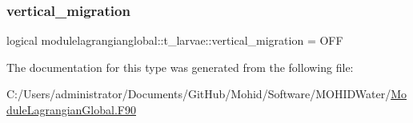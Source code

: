 \mbox{\label{structmodulelagrangianglobal_1_1t__larvae_aafa4ed785ca2f69e8e2d57cdf18af458}} 
\subsubsection{\texorpdfstring{vertical\+\_\+migration}{vertical\_migration}}
{\footnotesize\ttfamily logical modulelagrangianglobal\+::t\+\_\+larvae\+::vertical\+\_\+migration = O\+FF\hspace{0.3cm}{\ttfamily [private]}}



The documentation for this type was generated from the following file\+:\begin{DoxyCompactItemize}
\item 
C\+:/\+Users/administrator/\+Documents/\+Git\+Hub/\+Mohid/\+Software/\+M\+O\+H\+I\+D\+Water/\mbox{\hyperlink{_module_lagrangian_global_8_f90}{Module\+Lagrangian\+Global.\+F90}}\end{DoxyCompactItemize}
